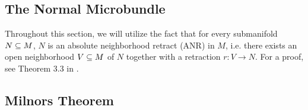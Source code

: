 \subsection*{The Normal Microbundle}\label{section::normal}{\blankbreak}
\begin{myparagraph}
    Throughout this section,
    we will utilize the fact that for every submanifold $N \subseteq{} M$,
    $N$ is an absolute neighborhood retract (ANR) in $M$,
    i.e. there exists an open neighborhood $V \subseteq{} M$ of $N$
    together with a retraction $r: V \to N$.
    For a proof, see Theorem 3.3 in \cite{hanner}.
\end{myparagraph}



\subsection*{Milnors Theorem}\label{section::milnor}

% 

